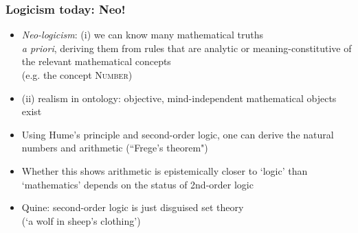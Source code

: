 \begin{frame}
\frametitle{Logicism today: Neo!}

\begin{itemize}%

\item \emph{Neo-logicism}: (i) we can know many mathematical truths \\ \textit{a priori}, deriving them from rules that are analytic or meaning-constitutive of the relevant mathematical concepts \\ (e.g. the concept \textsc{Number}) 
\item[] (ii) realism in ontology: objective, mind-independent mathematical objects exist

\item Using Hume's principle and second-order logic, one can derive the natural numbers and arithmetic (``Frege's theorem")

\item Whether this shows arithmetic is epistemically closer to `logic' than `mathematics' depends on the status of 2nd-order logic

\item Quine: second-order logic is just disguised set theory \\ (`a wolf in sheep's clothing')


\end{itemize}
\end{frame}



